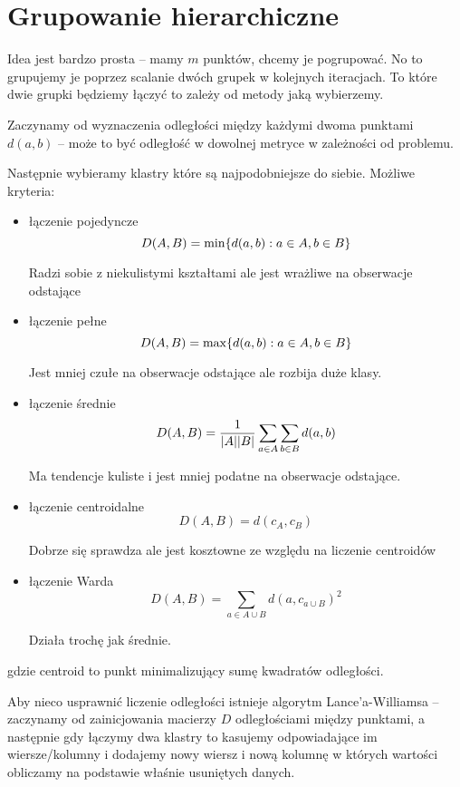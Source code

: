 \section{Grupowanie hierarchiczne}

Idea jest bardzo prosta -- mamy \( m \) punktów, chcemy je pogrupować.
No to grupujemy je poprzez scalanie dwóch grupek w kolejnych iteracjach.
To które dwie grupki będziemy łączyć to zależy od metody jaką wybierzemy.

Zaczynamy od wyznaczenia odległości między każdymi dwoma punktami \( d(a, b) \) -- może to być odległość w dowolnej metryce w zależności od problemu.

Następnie wybieramy klastry które są najpodobniejsze do siebie.
Możliwe kryteria:
\begin{itemize}
	\item łączenie pojedyncze
	      \[
		      D(A, B) = \min\braces{d(a, b) : a \in A, b \in B}
	      \]

	      Radzi sobie z niekulistymi kształtami ale jest wrażliwe na obserwacje odstające

	\item łączenie pełne
	      \[
		      D(A, B) = \max\braces{d(a, b) : a \in A, b \in B}
	      \]

	      Jest mniej czułe na obserwacje odstające ale rozbija duże klasy.

	\item łączenie średnie
	      \[
		      D(A, B) = \frac{1}{\card{A}\card{B}}\sum_{a\in A}\sum_{b \in B}d(a, b)
	      \]

	      Ma tendencje kuliste i jest mniej podatne na obserwacje odstające.

	\item łączenie centroidalne
	      \[
		      D(A, B) = d(c_A, c_B)
	      \]

	      Dobrze się sprawdza ale jest kosztowne ze względu na liczenie centroidów

	\item łączenie Warda
	      \[
		      D(A, B) = \sum_{a \in A \cup B} d(a, c_{a \cup B})^2
	      \]

	      Działa trochę jak średnie.

\end{itemize}
gdzie centroid to punkt minimalizujący sumę kwadratów odległości.

Aby nieco usprawnić liczenie odległości istnieje algorytm Lance'a-Williamsa -- zaczynamy od zainicjowania macierzy \( D \) odległościami między punktami, a następnie gdy łączymy dwa klastry to kasujemy odpowiadające im wiersze/kolumny i dodajemy nowy wiersz i nową kolumnę w których wartości obliczamy na podstawie właśnie usuniętych danych.


